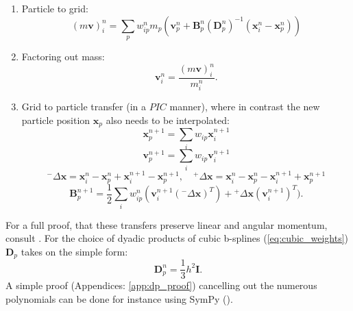 \documentclass[m,times]{cgMA}
\begin{document}
\begin{enumerate}
  \item Particle to grid:
    \begin{equation}\label{eq:apic_mom_p2g}
    (m\boldsymbol{v})^n_i = \sum_p w^n_{ip}m_p (\boldsymbol { v } _ { p } ^ { n } + \boldsymbol { B } _ { p } ^ { n } ( \boldsymbol { D } _ { p } ^ { n } ) ^ { - 1 } ( \boldsymbol { x } _ { i } ^ { n } - \boldsymbol { x } _ { p } ^ { n } ) )
\end{equation}
  \item Factoring out mass:
    \begin{equation}\label{eq:mass_divide}
      \boldsymbol{v}_i^n = \frac{(m\boldsymbol{v})_i^n}{m_i^n}.
    \end{equation}
  \item Grid to particle transfer (in a $PIC$ manner), where in contrast the new particle position $\boldsymbol{x}_p$ also needs to be interpolated:
    \begin{equation}
      \boldsymbol{x}_{p}^{n+1} = \sum_i w_{ip}\boldsymbol{x}_i^{n+1}
    \end{equation}
    \begin{equation}
      \boldsymbol{v}_{p}^{n+1} = \sum_i w_{ip}\boldsymbol{v}_i^{n+1}
    \end{equation}
    $$
    {^-}\Delta \boldsymbol{x} = \boldsymbol { x } _ { i } ^ { n } - \boldsymbol { x } _ { p } ^ { n } +   \boldsymbol { x }_ { i } ^ { n + 1 } - \boldsymbol { x } _ { p } ^ { n + 1 },
    \quad {^+}\Delta \boldsymbol{x} = \boldsymbol { x } _ { i } ^ { n } - \boldsymbol { x } _ { p } ^ { n } -  { \boldsymbol { x } } _ { i } ^ { n + 1 } + \boldsymbol { x } _ { p } ^ { n + 1 }
    $$
\begin{equation}\label{eq:apic_mom_g2p}
  \boldsymbol { B } _ { p } ^ { n + 1 } = \frac { 1 } { 2 } \sum _ { i } w _ { i p } ^ { n } (\boldsymbol { v }_ { i } ^ { n + 1 } ({^-}\Delta \boldsymbol{x}) ^ { T }) {+}  {^+}\Delta \boldsymbol{x} ( { \boldsymbol { v } } _ { i } ^ { n + 1 } ) ^ { T }).
\end{equation}

\end{enumerate}
For a full proof, that these transfers preserve linear and angular momentum, consult \cite{MPM:APIC}. For the choice of dyadic products of cubic b-splines (\ref{eq:cubic_weights}) $\boldsymbol{D}_p$ takes on the simple form:
\begin{equation}
\boldsymbol{D}_p^n = \frac { 1 } { 3 } h ^ { 2 } \boldsymbol { I }.
\end{equation}
A simple proof (Appendices: \ref{app:dp_proof}) cancelling out the numerous polynomials can be done for instance using SymPy (\cite{Sympy}).\cite{MPM:APIC}\cite{MPM:OLD_APIC}
\end{document}

